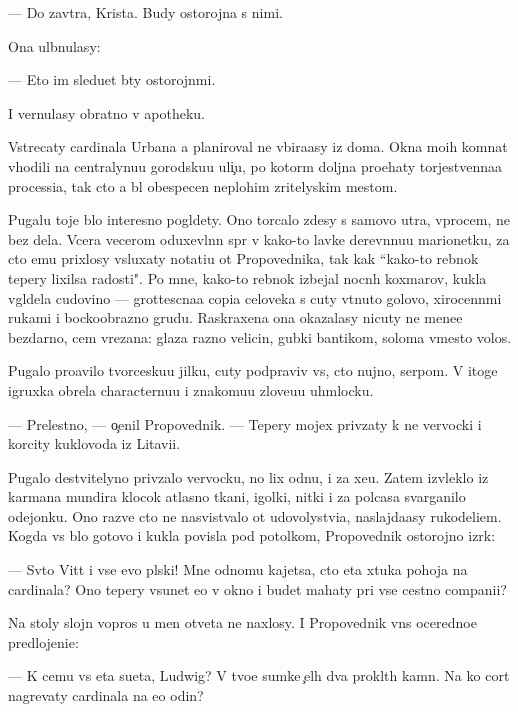 \documentclass[10pt]{book}
\begin{document}
— Do zavtra, Krista. Budy ostorojna s nimi.

Ona ul{\yi}bnulasy:

— Eto im sledu{\y}et b{\yi}ty ostorojn{\yi}mi.

I vernulasy obratno v apotheku.

Vstrecaty cardinala Urbana {\y}a planiroval ne v{\yi}bira{\y}asy iz doma. Okna mo{\y}ih komnat v{\yi}hodili na centralynu{\y}u gorodsku{\y}u uli{\c}u, po kotor{\yi}m doljna pro{\y}ehaty torjestvenna{\y}a processi{\y}a, tak cto {\y}a b{\yi}l obespecen neplohim zritelyskim mestom.

Pugalu toje b{\yi}lo interesno pogl{\ia}dety. Ono torcalo zdesy s samovo utra, vprocem, ne bez dela. Vcera vecerom oduxevl{\e}nn{\yi}{\y} sp{\e}r v kako{\y}-to lavke derev{\ia}nnu{\y}u marionetku, za cto {\y}emu prixlosy v{\yi}sluxaty notati{\y}u ot Propovednika, tak kak ``kako{\y}-to reb{\e}nok tepery lixilsa radosti". Po mne, kako{\y}-to reb{\e}nok izbejal nocn{\yi}h koxmarov, kukla v{\yi}gl{\ia}dela cudovi{\x}no — grottescna{\y}a copi{\y}a celoveka s cuty v{\yi}t{\ia}nuto{\y} golovo{\y}, xirocenn{\yi}mi rukami i bockoobrazno{\y} grud{\y}u. Raskraxena ona okazalasy nicuty ne mene{\y}e bezdarno, cem v{\yi}rezana: glaza razno{\y} velicin{\yi}, gubki bantikom, soloma vmesto volos.

Pugalo pro{\y}avilo tvorcesku{\y}u jilku, cuty podpraviv vs{\e}, cto nujno, serpom. V itoge igruxka obrela characternu{\y}u i znakomu{\y}u zlove{\x}u{\y}u uhm{\yi}locku.

— Prelestno, — o{\c}enil Propovednik. — Tepery mojex priv{\ia}zaty k ne{\y} ver{\e}vocki i korcity kuklovoda iz Litavi{\y}i.

Pugalo de{\y}stvitelyno priv{\ia}zalo ver{\e}vocku, no lix odnu, i za xe{\y}u. Zatem izvleklo iz karmana mundira klocok atlasno{\y} tkani, igolki, nitki i za polcasa svarganilo odejonku. Ono razve cto ne nasvist{\yi}valo ot udovolystvi{\y}a, naslajda{\y}asy rukodeli{\y}em. Kogda vs{\e} b{\yi}lo gotovo i kukla povisla pod potolkom, Propovednik ostorojno izr{\e}k:

— Sv{\ia}to{\y} Vitt i vse {\y}evo pl{\ia}ski! Mne odnomu kajetsa, cto eta xtuka pohoja na cardinala? Ono tepery v{\yi}sunet {\y}e{\y}o v okno i budet mahaty pri vse{\y} cestno{\y} compani{\y}i?

Na stoly slojn{\yi}{\y} vopros u men{\ia} otveta ne naxlosy. I Propovednik vn{\e}s oceredno{\y}e predlojeni{\y}e:

— K cemu vs{\ia} eta su{\y}eta, Ludwig? V tvo{\y}e{\y} sumke {\c}el{\yi}h dva prokl{\ia}t{\yi}h kamn{\ia}. Na ko{\y} cort nagrevaty cardinala na {\y}e{\x}o odin?
\end{document}
